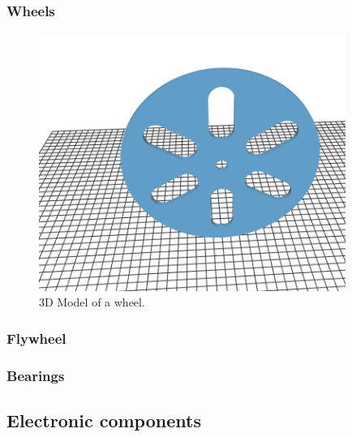 \subsubsection{Wheels}
\begin{figure}[H]
    \centering
    \includegraphics[width=10cm]{img/components/wheel.png}
    \caption{3D Model of a wheel.}
    \label{fig:}
\end{figure}
\subsubsection{Flywheel}
\subsubsection{Bearings}
\subsection{Electronic components}
